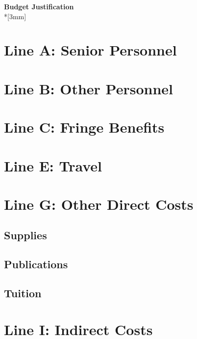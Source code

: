 \renewcommand{\LeftFooter}{Budget Justification}
\renewcommand{\LeftHeader}{A.J. Medford, M.C. Hatzell, Y. Tang}
\renewcommand{\PageLimit}{0}
\begin{center}
{\bf Budget Justification} \\*[3mm]
\end{center}

\setcounter{section}{0}

\section*{Line A: Senior Personnel}


\section*{Line B: Other Personnel}

\section*{Line C: Fringe Benefits}


\section*{Line E: Travel}

\section*{Line G: Other Direct Costs}
\subsection*{Supplies}

\subsection*{Publications}

\subsection*{Tuition}

\section*{Line I: Indirect Costs}
